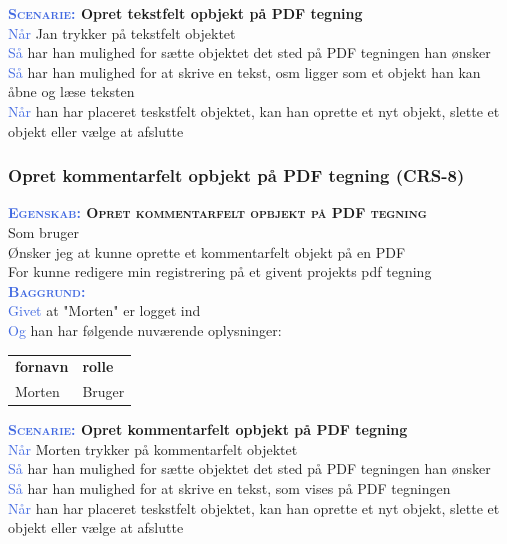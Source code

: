 \textbf{\textsc{\textcolor{RoyalBlue}{Scenarie:}} Opret tekstfelt opbjekt på PDF tegning}\\
\textcolor{RoyalBlue}{Når} Jan trykker på tekstfelt objektet\\
\textcolor{RoyalBlue}{Så}  har han mulighed for sætte objektet det sted på PDF tegningen han ønsker\\
\textcolor{RoyalBlue}{Så}  har han mulighed for at skrive en tekst, osm ligger som et objekt han kan åbne og læse teksten\\
\textcolor{RoyalBlue}{Når} han har placeret teskstfelt objektet, kan han oprette et nyt objekt, slette et objekt eller vælge at afslutte \\

\subsubsection{Opret kommentarfelt opbjekt på PDF tegning (CRS-8)} \label{sec:USOpretKommentarfelt}
\textbf{\textsc{\textcolor{RoyalBlue}{Egenskab:} Opret kommentarfelt opbjekt på PDF tegning}}\\
Som bruger\\
Ønsker jeg at kunne oprette et kommentarfelt objekt på en PDF\\
For kunne redigere min registrering på et givent projekts pdf tegning\\

\textsc{\textcolor{RoyalBlue}{\textbf{Baggrund:}}}\\
\textcolor{RoyalBlue}{Givet} at "Morten" er logget ind\\
\textcolor{RoyalBlue}{Og} han har følgende nuværende oplysninger:\\
\begin{tabular}{| l | l |}
	\textbf{fornavn} & \textbf{rolle} \\
	Morten & Bruger\\
\end{tabular}

\textbf{\textsc{\textcolor{RoyalBlue}{Scenarie:}} Opret kommentarfelt opbjekt på PDF tegning}\\
\textcolor{RoyalBlue}{Når} Morten trykker på kommentarfelt objektet\\
\textcolor{RoyalBlue}{Så}  har han mulighed for sætte objektet det sted på PDF tegningen han ønsker\\
\textcolor{RoyalBlue}{Så}  har han mulighed for at skrive en tekst, som vises på PDF tegningen\\
\textcolor{RoyalBlue}{Når} han har placeret teskstfelt objektet, kan han oprette et nyt objekt, slette et objekt eller vælge at afslutte \\

